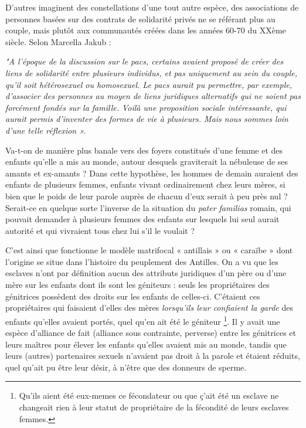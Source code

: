 D'autres imaginent des constellations d'une tout autre espèce, des associations de personnes basées sur des contrats de solidarité privés ne se référant plus au couple, mais plutôt aux communautés créées dans les années 60-70 du XXème siècle. Selon Marcella Jakub :
\begin{displayquote}  
\emph{"A l'époque de la discussion sur le pacs, certains avaient proposé de créer des liens de solidarité entre plusieurs individus, et pas uniquement au sein du couple, qu'il soit hétérosexuel ou homosexuel. Le pacs aurait pu permettre, par exemple, d'associer des personnes au moyen de liens juridiques alternatifs qui ne soient pas forcément fondés sur la famille. Voilà une proposition sociale intéressante, qui aurait permis d'inventer des formes de vie à plusieurs. Mais nous sommes loin d'une telle réflexion ».}
\end{displayquote}
 
 Va-t-on de manière plus banale vers des foyers constitués d'une femme et des enfants qu'elle a mis au monde, autour desquels graviterait la nébuleuse de ses amants et ex-amants ? Dans cette hypothèse, les hommes de demain auraient des enfants de plusieurs femmes, enfants vivant ordinairement chez leurs mères, si bien que le poids de leur parole auprès de chacun d'eux serait à peu près nul ? Serait-ce en quelque sorte l'inverse de la situation du \emph{pater familias} romain, qui pouvait demander à plusieurs femmes des enfants sur lesquels lui seul aurait autorité et qui vivraient tous chez lui s’il le voulait ?
 
 
 C'est ainsi que fonctionne le modèle matrifocal « antillais » ou « caraïbe » dont l'origine se situe dans l'histoire du peuplement des Antilles. On a vu que les esclaves n'ont par définition aucun des attributs juridiques d'un père ou d'une mère sur les enfants dont ils sont les géniteurs : seuls les propriétaires des génitrices possèdent des droits sur les enfants de celles-ci. C'étaient ces propriétaires qui faisaient d'elles des mères \emph{lorsqu'ils leur confiaient la garde} des enfants qu'elles avaient portés, quel qu'en ait été le géniteur \footnote{Qu'ils aient été eux-memes ce fécondateur ou que ç'ait été un esclave ne changeait rien à leur statut de propriétaire de la fécondité de leurs esclaves femmes.}. Il y avait une espèce d'alliance de fait (alliance sous contrainte, perverse) entre les génitrices et leurs maîtres pour élever les enfants qu'elles avaient mis au monde, tandis que leurs (autres) partenaires sexuels n'avaient pas droit à la parole et étaient réduits, quel qu'ait pu être leur désir,  à n'être que des donneurs de sperme. 
 
